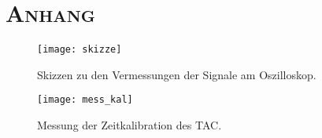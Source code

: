 \clearpage
\section{\textsc{Anhang}}
\begin{figure}[h]
\texttt{[image: skizze]}
\caption{Skizzen zu den Vermessungen der Signale am Oszilloskop.}
\label{fig:skizze}
\end{figure}
\begin{figure}[p]
\begin{center}
\texttt{[image: mess\_kal]}
\caption{Messung der Zeitkalibration des TAC.}
\label{fig:mess_kal}
\end{center}
\end{figure}